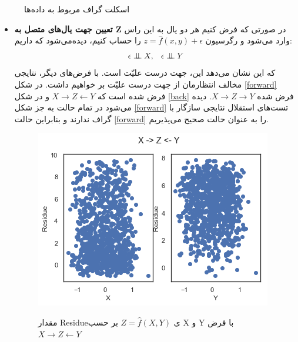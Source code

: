 \documentclass[papersize=a4]{report}
\newcommand{\bigCI}{\mathrel{\text{\scalebox{1.07}{$\perp\mkern-10mu\perp$}}}}
\begin{document}
\begin{figure}
\label{skeleton}
\caption{اسکلت گراف مربوط به داده‌ها}
\end{figure}
\vspace{0.1cm}
\begin{itemize}
	\item	\textbf{ تعیین جهت یال‌های متصل به Z}	
	در صورتی که فرض کنیم هر دو یال به این راس وارد می‌شود و رگرسیون
	$z = \hat{f} (x, y) + \epsilon$
	را حساب کنیم، دیده‌می‌شود که داریم:
	$$\epsilon \bigCI X, \; \;\; \epsilon \bigCI Y$$
	که این نشان می‌دهد این، جهت درست علیّت است. با فرض‌های دیگر، نتایجی مخالف انتظارمان از جهت درست علیّت بر خواهیم داشت.
در شکل
\eqref{forward}
فرض شده است که $X \rightarrow Z \leftarrow Y$	و در شکل 
\eqref{back}
فرض شده 
$X \rightarrow Z \rightarrow Y$.
دیده می‌شود در تمام حالت به جز شکل
\eqref{forward}
تست‌های استقلال نتایجی سازگار با گراف ندارند و بنابراین حالت 
\eqref{forward}
را به عنوان حالت صحیح می‌پذیریم.

\begin{figure}[h]
	\includegraphics[scale=0.455]{b1.png}
	\label{forward}
	\caption{
		مقدار Residueی
		 $Z = \hat{f}(X,Y)$
		بر حسب X و Y با فرض 
		$X \rightarrow Z \leftarrow Y$	
}
\end{figure}


\end{itemize}
\end{document}
